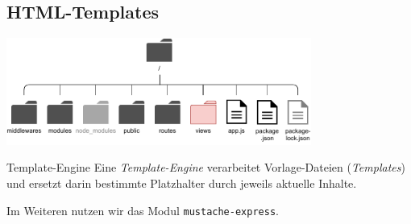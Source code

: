 \subsection{HTML-Templates}

\begin{center}
    \includegraphics[width=0.75\textwidth]{includes/figures/bonus_nodejs_views.pdf}
\end{center}

\begin{defi}{Template-Engine}
    Eine \emph{Template-Engine} verarbeitet Vorlage-Dateien (\emph{Templates}) und ersetzt darin bestimmte Platzhalter durch jeweils aktuelle Inhalte.

    Im Weiteren nutzen wir das Modul \texttt{mustache-express}.
\end{defi}

